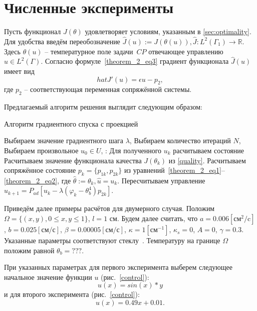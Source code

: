 \documentclass[10pt]{article}
\begin{document}
    \section{Численные эксперименты}\label{sec:experiments}

    Пусть функционал $J(\theta)$ удовлетворяет условиям, указанным в \autoref{sec:optimality}.
    Для удобства введём переобозначение
    $\hat{J}(u):=J(\theta(u)), \hat{J}:L^2(\Gamma_1) \to \mathbb{R}$.
    Здесь $\theta(u)$ -- температурное поле задачи~$CP$ отвечающее управлению $u \in L^2(\Gamma)$.
    Согласно формуле~\eqref{theorem_2_eq3} градиент функционала $\hat{J}(u)$
    имеет вид
    \[ hat{J}'(u)= \epsilon u - p_2, \]
    где $p_2$ -- соответствующая переменная сопряжённой системы.

    Предлагаемый алгоритм решения выглядит следующим образом:
    \begin{algorithm}[H]
        \caption{Алгоритм градиентного спуска с проекцией}
        \begin{algorithmic}[1]
            \State Выбираем значение градиентного шага $\lambda$,
            \State Выбираем количество итераций $N$,
            \State Выбираем произвольное $u_0 \in U$,
            :
            \State Для полученного $u_k$ расчитываем состояние
            \State Расчитываем значение функционала качества $J(\theta_k)$ из \eqref{quality}.
            \State Расчитываем сопряжённое состояние $p_k=\{p_{1k},p_{2k}\}$ из
            уравнений~\eqref{theorem_2_eq1}--\eqref{theorem_2_eq2},
            где $ \hat{\theta} := \theta_k, \hat{u}=u_k$.
            \State Пересчитываем управление
            $u_{k+1} = P_{ad}\left[ u_k - \lambda (\varphi_k - \theta_b^4)p_{2k} \right]$.
            \EndFor
        \end{algorithmic}
    \end{algorithm}
    Приведём далее примеры расчётов для двумерного случая.
    Положим $\Omega = \{(x,y), 0 \leq x,y \leq 1\}$, $l = 1$ см.
    Будем далее считать, что $a = 0.006[\text{см}^2/\text{c}]$, $b=0.025[\text{см}/\text{с}]$,
    $\beta = 0.00005[\text{см}/\text{с}]$, $\kappa=1[\text{см}^{-1}]$, $\kappa_s = 0$, $A = 0$,
    $\gamma = 0.3$.
    Указанные параметры соответствуют стеклу~\cite{grenkin_13}.
    Температуру на границе $\Omega$ положим равной $\theta_b = ???$.

    При указанных параметрах для первого эксперимента выберем следующее начальное значение
    функции $u$ (рис.~\ref{control}):
    \begin{equation}
        \label{test_function_1}
        u(x)= sin(x) * y
    \end{equation}
    и для второго эксперимента (рис.~\ref{control}):
    \begin{equation}
        \label{test_function_2}
        u(x)=0.49x+0.01.
    \end{equation}
\end{document}
